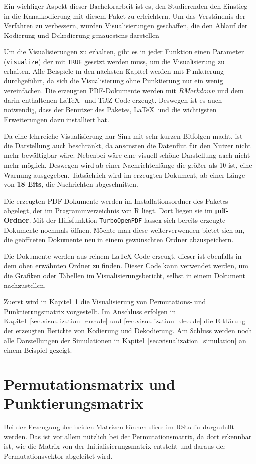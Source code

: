 Ein wichtiger Aspekt dieser Bachelorarbeit ist es, den Studierenden den Einstieg in die Kanalkodierung mit diesem Paket zu erleichtern. Um das Verständnis der Verfahren zu verbessern, wurden Visualisierungen geschaffen, die den Ablauf der Kodierung und Dekodierung genauestens darstellen.

Um die Visualisierungen zu erhalten, gibt es in jeder Funktion einen Parameter (\texttt{visualize}) der mit \texttt{TRUE} gesetzt werden muss, um die Visualisierung zu erhalten. Alle Beispiele in den nächsten Kapitel werden mit Punktierung durchgeführt, da sich die Visualisierung ohne Punktierung nur ein wenig vereinfachen. Die erzeugten PDF-Dokumente werden mit \emph{RMarkdown} und dem darin enthaltenen \LaTeX - und Ti\textit{k}Z-Code erzeugt. Deswegen ist es auch notwendig, dass der Benutzer des Paketes, \LaTeX\ und die wichtigsten Erweiterungen dazu installiert hat.

Da eine lehrreiche Visualisierung nur Sinn mit sehr kurzen Bitfolgen macht, ist die Darstellung auch beschränkt, da ansonsten die Datenflut für den Nutzer nicht mehr bewältigbar wäre. Nebenbei wäre eine visuell schöne Darstellung auch nicht mehr möglich. Deswegen wird ab einer Nachrichtenlänge die größer als 10 ist, eine Warnung ausgegeben. Tatsächlich wird im erzeugten Dokument, ab einer Länge von \textbf{18 Bits}, die Nachrichten abgeschnitten.

Die erzeugten PDF-Dokumente werden im Installationsordner des Paketes abgelegt, der im Programmverzeichnis von R liegt. Dort liegen sie im \textbf{pdf-Ordner}. Mit der Hilfsfunktion \texttt{TurboOpenPDF} lassen sich bereits erzeugte Dokumente nochmals öffnen. Möchte man diese weiterverwenden bietet sich an, die geöffneten Dokumente neu in einem gewünschten Ordner abzuspeichern.

Die Dokumente werden aus reinem \LaTeX -Code erzeugt, dieser ist ebenfalls in dem oben erwähnten Ordner zu finden. Dieser Code kann verwendet werden, um die Grafiken oder Tabellen im Visualisierungsbericht, selbst in einem Dokument nachzustellen.

Zuerst wird in Kapitel~\ref{sec:visualization_punctuationPermutation} die Visualisierung von Permutations- und Punktierungsmatrix vorgestellt. Im Anschluss erfolgen in Kapitel~\ref{sec:visualization_encode} und \ref{sec:visualization_decode} die Erklärung der erzeugten Berichte von Kodierung und Dekodierung. Am Schluss werden noch alle Darstellungen der Simulationen in Kapitel~\ref{sec:visualization_simulation} an einem Beispiel gezeigt. 
\section{Permutationsmatrix und Punktierungsmatrix}
\label{sec:visualization_punctuationPermutation}
Bei der Erzeugung der beiden Matrizen können diese im RStudio dargestellt werden. Das ist vor allem nützlich bei der Permutationsmatrix, da dort erkennbar ist, wie die Matrix von der Initialisierungsmatrix entsteht und daraus der Permutationsvektor abgeleitet wird. 

